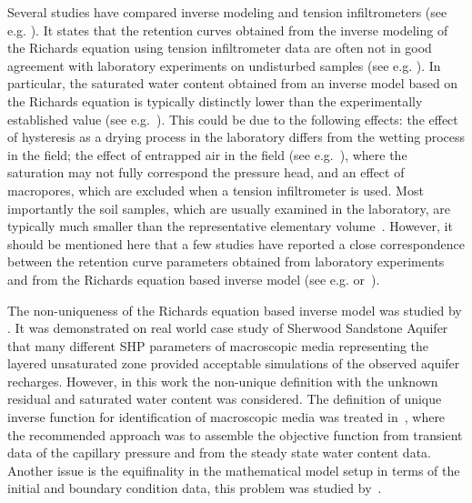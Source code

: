 \documentclass[review]{myarticle}
\begin{document}
 Several studies have compared inverse modeling and tension infiltrometers (see e.g. \citep{Verbist, Simunek1, Ventrella, Schwartz, Ramos, Simunek2}). It states that the retention curves obtained from the inverse modeling of the Richards equation using tension infiltrometer data are often not in good agreement with laboratory experiments on undisturbed samples (see e.g. \citep{rezaei}). In particular, the saturated water content obtained from an inverse model based on  the Richards equation is typically distinctly lower than the experimentally established value (see e.g.~\citep{Simunek1, Verbist}). This could be due to the following effects: the effect of hysteresis as a drying process in the laboratory differs from the wetting process in the field; the effect of entrapped air in the field (see e.g.~\citep{Fodor}), where the saturation may not fully correspond the pressure head, and an effect of macropores, which are excluded when a tension infiltrometer is used. Most importantly the soil samples, which are usually  examined in the laboratory, are typically much smaller than the representative elementary volume~\citep{scharnagl}.
 However, it should be mentioned here that a few studies have reported a close correspondence between the retention curve parameters obtained from laboratory experiments and from the Richards equation based inverse model (see e.g.\citep{Ramos} or~\citep{Schwartz}).

The non-uniqueness of the Richards equation based inverse model was studied by \citep{beven2003-uncertain}. It was demonstrated on real world case study of Sherwood Sandstone Aquifer that many different SHP parameters of macroscopic media representing the layered  unsaturated zone provided acceptable simulations of the observed aquifer recharges. However, in this work 
the non-unique definition with the unknown residual and saturated water content was considered.
The definition of unique inverse function for identification of macroscopic media was treated in~\citep{zou200126}, where the recommended approach was to assemble the objective function from transient data of the capillary pressure and from the steady state water content data. Another issue is the equifinality in the mathematical model setup in terms of the initial and boundary condition data, this problem was studied by~\citep{klaus-hydrol}.
\end{document}

